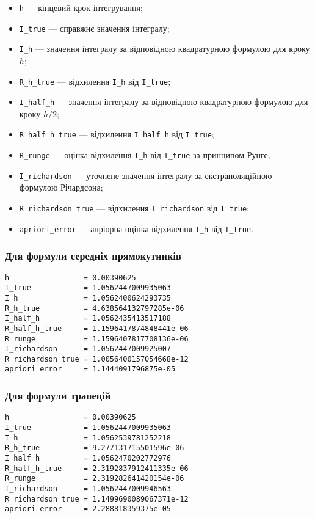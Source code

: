 \begin{itemize}
	\item {\tt h} --- кінцевий крок інтегрування;
	\item {\tt I\_true} --- справжнє значення інтегралу;
	\item {\tt I\_h} --- значення інтегралу за відповідною квадратурною формулою для кроку $h$;
	\item {\tt R\_h\_true} --- відхилення {\tt I\_h} від {\tt I\_true};
	\item {\tt I\_half\_h} --- значення інтегралу за відповідною квадратурною формулою для кроку $h / 2$;
	\item {\tt R\_half\_h\_true} --- відхилення {\tt I\_half\_h} від {\tt I\_true};
	\item {\tt R\_runge} --- оцінка відхилення {\tt I\_h} від {\tt I\_true} за принципом Рунге;
	\item {\tt I\_richardson} --- уточнене значення інтегралу за екстраполяційною формулою Річардсона;
	\item {\tt R\_richardson\_true} --- відхилення {\tt I\_richardson} від {\tt I\_true};
	\item {\tt apriori\_error} --- апріорна оцінка відхилення {\tt I\_h} від {\tt I\_true}.
\end{itemize}

\subsubsection{Для формули середніх прямокутників}

\begin{verbatim}
h                 = 0.00390625
I_true            = 1.0562447009935063
I_h               = 1.0562400624293735
R_h_true          = 4.638564132797285e-06
I_half_h          = 1.0562435413517188
R_half_h_true     = 1.1596417874848441e-06
R_runge           = 1.1596407817708136e-06
I_richardson      = 1.0562447009925007
R_richardson_true = 1.0056400157054668e-12
apriori_error     = 1.1444091796875e-05
\end{verbatim}

\subsubsection{Для формули трапецій}

\begin{verbatim}
h                 = 0.00390625
I_true            = 1.0562447009935063
I_h               = 1.0562539781252218
R_h_true          = 9.277131715501596e-06
I_half_h          = 1.0562470202772976
R_half_h_true     = 2.3192837912411335e-06
R_runge           = 2.319282641420154e-06
I_richardson      = 1.0562447009946563
R_richardson_true = 1.1499690089067371e-12
apriori_error     = 2.288818359375e-05
\end{verbatim}

